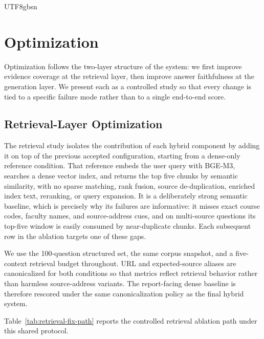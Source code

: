 \documentclass{article}
\begin{document}
\begin{CJK*}{UTF8}{gbsn}
\section{Optimization}
\label{sec:optimization}

Optimization follows the two-layer structure of the system: we first improve evidence coverage at the retrieval layer, then improve answer faithfulness at the generation layer. We present each as a controlled study so that every change is tied to a specific failure mode rather than to a single end-to-end score.

\subsection{Retrieval-Layer Optimization}
\label{sec:retrieval-optimization}

The retrieval study isolates the contribution of each hybrid component by adding it on top of the previous accepted configuration, starting from a dense-only reference condition. That reference embeds the user query with BGE-M3, searches a dense vector index, and returns the top five chunks by semantic similarity, with no sparse matching, rank fusion, source de-duplication, enriched index text, reranking, or query expansion. It is a deliberately strong semantic baseline, which is precisely why its failures are informative: it misses exact course codes, faculty names, and source-address cues, and on multi-source questions its top-five window is easily consumed by near-duplicate chunks. Each subsequent row in the ablation targets one of these gaps.

We use the 100-question structured set, the same corpus snapshot, and a five-context retrieval budget throughout. URL and expected-source aliases are canonicalized for both conditions so that metrics reflect retrieval behavior rather than harmless source-address variants. The report-facing dense baseline is therefore rescored under the same canonicalization policy as the final hybrid system.

Table~\ref{tab:retrieval-fix-path} reports the controlled retrieval ablation path under this shared protocol.


\end{CJK*}
\end{document}
